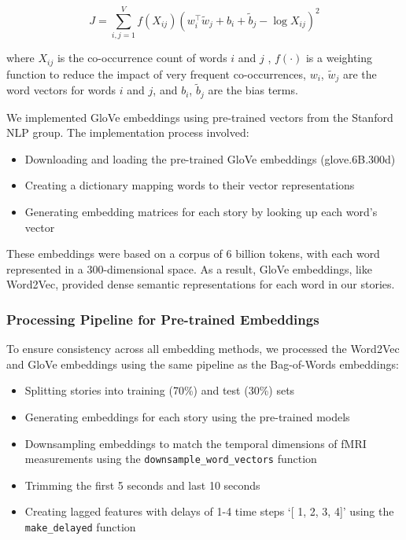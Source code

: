 \documentclass[12pt,letterpaper]{article}
\begin{document}
\begin{equation}
J = \sum_{i,j=1}^{V} f(X_{ij})\left(w_i^\top \tilde{w}_j + b_i + \tilde{b}_j - \log X_{ij}\right)^2
\end{equation}

\noindent
where $X_{ij}$ is the co-occurrence count of words $i$ and $j$ , $f(\cdot)$ is a weighting function to reduce the impact of very frequent co-occurrences, $w_i$, $\tilde{w}_j$ are the word vectors for words $i$ and $j$, and $b_i$, $\tilde{b}_j$ are the bias terms.




We implemented GloVe embeddings using pre-trained vectors from the Stanford NLP group. The implementation process involved:
\begin{itemize}[itemsep=0.2cm]
    \item Downloading and loading the pre-trained GloVe embeddings (glove.6B.300d)
    \item Creating a dictionary mapping words to their vector representations
    \item Generating embedding matrices for each story by looking up each word's vector
\end{itemize}
These embeddings were based on a corpus of 6 billion tokens, with each word represented in a 300-dimensional space. As a result, GloVe embeddings, like Word2Vec, provided dense semantic representations for each word in our stories.
\subsubsection {Processing Pipeline for Pre-trained Embeddings}

To ensure consistency across all embedding methods, we processed the Word2Vec and GloVe embeddings using the same pipeline as the Bag-of-Words embeddings:


\begin{itemize}[itemsep=0.2cm]
    \item Splitting stories into training (70\%) and test (30\%) sets
    \item Generating embeddings for each story using the pre-trained models
    \item Downsampling embeddings to match the temporal dimensions of fMRI measurements using the \allowbreak\texttt{downsample\_word\_vectors} function


    \item Trimming the first 5 seconds and last 10 seconds
    \item Creating lagged features with delays of 1-4 time steps `[ 1, 2, 3, 4]' using the \texttt{make\_delayed} function
\end{itemize}
\end{document}
